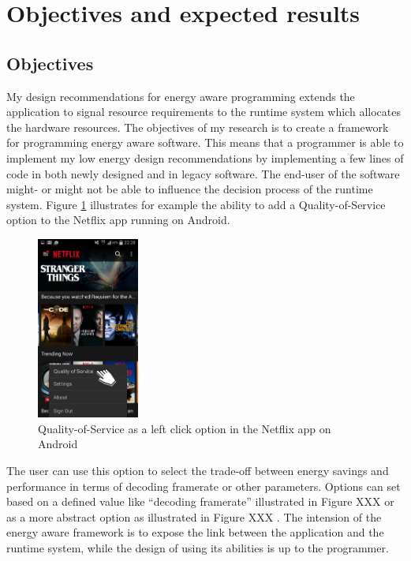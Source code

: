 \documentclass{article}
\begin{document}
\section{Objectives and expected results}
\subsection{Objectives}
My design recommendations for energy aware programming extends the application to signal resource requirements to the runtime system which allocates the hardware resources.
The objectives of my research is to create a framework for programming energy aware software. 
This means that a programmer is able to implement my low energy design recommendations by implementing a few lines of code in both newly designed and in legacy software.
The end-user of the software might- or might not be able to influence the decision process of the runtime system. 
Figure \ref{fig:netflix} illustrates for example the ability to add a Quality-of-Service option to the Netflix app running on Android. 

\begin{figure}
  \begin{center}
    \includegraphics[width=0.3\textwidth]{fig/netflix.png}
  \end{center}
  \caption{Quality-of-Service as a left click option in the Netflix app on Android}
  \label{fig:netflix}
  \vspace{-2cm}
\end{figure}
The user can use this option to select the trade-off between energy savings and performance in terms of decoding framerate or other parameters. 
Options can set based on a defined value like ``decoding framerate'' illustrated in Figure XXX  or as a more abstract option as illustrated in Figure XXX . 
The intension of the energy aware framework is to expose the link between the application and the runtime system, while the design of using its abilities is up to the programmer.
\end{document}
